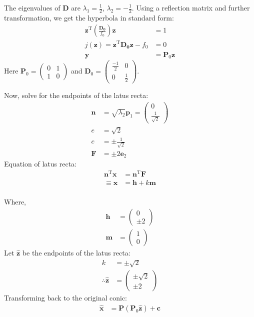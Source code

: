 \documentclass{beamer}
\providecommand{\brak}[1]{\ensuremath{\left(#1\right)}}
\theoremstyle{remark}
\newcommand{\myvec}[1]{\ensuremath{\begin{pmatrix}#1\end{pmatrix}}}
\let\vec\mathbf
\numberwithin{equation}{section}
\begin{document}
\begin{frame}
	The eigenvalues of $\vec{D}$ are $\lambda_1 = \frac{1}{2}$, $\lambda_2=-\frac{1}{2}$. Using a reflection matrix and further transformation, we get the hyperbola in standard form:
	\begin{align}
		\vec{z}^\text{T}\brak{\frac{\vec{D_0}}{f_0}}\vec{z} &= 1\\
		j(\vec{z}) = \vec{z}^\text{T}\vec{D_0}\vec{z} - f_0 &= 0  \label{standard_conic}\\
		\vec{y} &= \vec{P}_0\vec{z} \label{t2}
	\end{align}
	Here $\vec{P}_0 = \myvec{0 & 1 \\ 1 & 0}$ and $\vec{D}_0 = \myvec{\frac{-1}{2} & 0 \\ 0 & \frac{1}{2}}$.
	
\end{frame}


\begin{frame}
Now, solve for the endpoints of the latus recta:
	\begin{align}
		\vec{n} &= \sqrt{\lambda_2}\vec{p}_1 = \myvec{0 \\ \frac{1}{\sqrt{2}}}\\
		e &= \sqrt{2}\\
		c &= \pm \frac{1}{\sqrt{2}}\\
		\vec{F} &= \pm 2 \vec{e}_2
	\end{align}
	Equation of latus recta:
	\begin{align}
		\vec{n}^\text{T}\vec{x} &= \vec{n}^\text{T}\vec{F}\\
		\equiv \vec{x} &= \vec{h} + k\vec{m} \label{latus_rectum}\\
	\end{align}
\end{frame}

\begin{frame}
Where,
\begin{align}
\vec{h} &= \myvec{0 \\ \pm 2}\\
		\vec{m} &= \myvec{1 \\ 0}
\end{align}
Let $\vec{\hat{z}}$ be the endpoints of the latus recta:
	\begin{align}
		k &= \pm \sqrt{2}\\
		\therefore \vec{\hat{z}} &= \myvec{\pm \sqrt{2} \\ \pm 2}
	\end{align}
	Transforming back to the original conic:
	\begin{align}
		\vec{\hat{x}} &= \vec{P}\brak{\vec{P}_0 \vec{\hat{z}}} + \vec{c}
	\end{align}
\end{frame}
\end{document}

